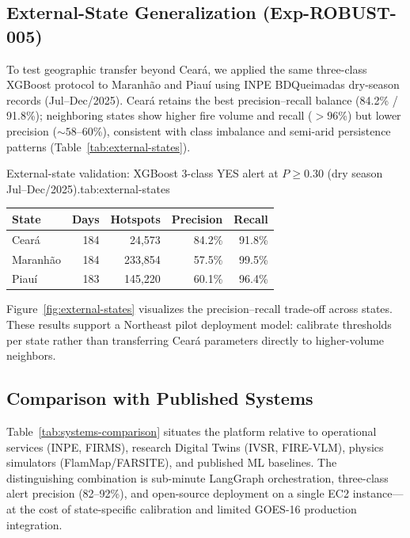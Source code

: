 \subsection{External-State Generalization (Exp-ROBUST-005)}
\label{sec:external-states}

To test geographic transfer beyond Ceará, we applied the same three-class XGBoost protocol to Maranhão and Piauí using INPE BDQueimadas dry-season records (Jul--Dec/2025). Ceará retains the best precision--recall balance (84.2\% / 91.8\%); neighboring states show higher fire volume and recall (${>}96$\%) but lower precision (${\sim}58$--60\%), consistent with class imbalance and semi-arid persistence patterns (Table~\ref{tab:external-states}).

\begin{resulttable}{External-state validation: XGBoost 3-class YES alert at $P\geq 0.30$ (dry season Jul--Dec/2025).}{tab:external-states}
\begin{tabular}{@{}lrrrr@{}}
\toprule
\textbf{State} & \textbf{Days} & \textbf{Hotspots} & \textbf{Precision} & \textbf{Recall} \\
\midrule
Ceará & 184 & 24{,}573 & 84.2\% & 91.8\% \\
Maranhão & 184 & 233{,}854 & 57.5\% & 99.5\% \\
Piauí & 183 & 145{,}220 & 60.1\% & 96.4\% \\
\bottomrule
\end{tabular}
\end{resulttable}

Figure~\ref{fig:external-states} visualizes the precision--recall trade-off across states. These results support a Northeast pilot deployment model: calibrate thresholds per state rather than transferring Ceará parameters directly to higher-volume neighbors.


\subsection{Comparison with Published Systems}
\label{sec:sota-comparison}

Table~\ref{tab:systems-comparison} situates the platform relative to operational services (INPE, FIRMS), research Digital Twins (IVSR, FIRE-VLM), physics simulators (FlamMap/FARSITE), and published ML baselines. The distinguishing combination is sub-minute LangGraph orchestration, three-class alert precision (82--92\%), and open-source deployment on a single EC2 instance---at the cost of state-specific calibration and limited GOES-16 production integration.

